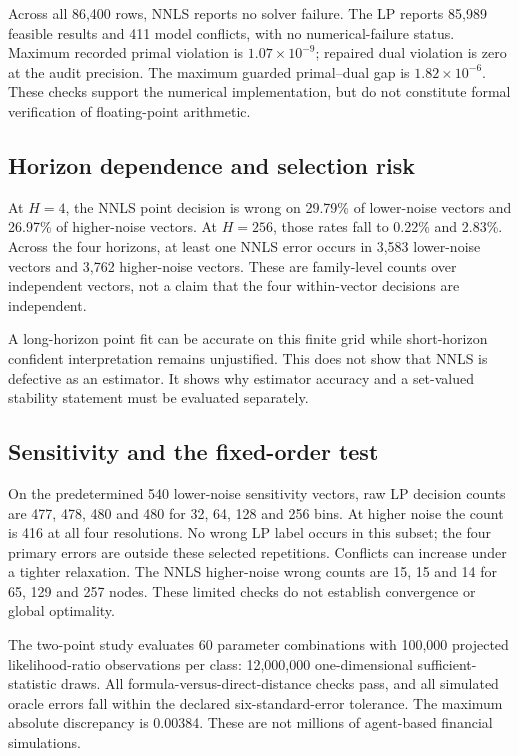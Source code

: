 \documentclass[11pt]{article}
\theoremstyle{remark}\newtheorem{remark}[proposition]{Remark}
\begin{document}
Across all 86,400 rows, NNLS reports no solver failure. The LP reports 85,989 feasible results and 411 model conflicts, with no numerical-failure status. Maximum recorded primal violation is $1.07\times10^{-9}$; repaired dual violation is zero at the audit precision. The maximum guarded primal--dual gap is $1.82\times10^{-6}$. These checks support the numerical implementation, but do not constitute formal verification of floating-point arithmetic.

\subsection{Horizon dependence and selection risk}
At $H=4$, the NNLS point decision is wrong on 29.79\% of lower-noise vectors and 26.97\% of higher-noise vectors. At $H=256$, those rates fall to 0.22\% and 2.83\%. Across the four horizons, at least one NNLS error occurs in 3,583 lower-noise vectors and 3,762 higher-noise vectors. These are family-level counts over independent vectors, not a claim that the four within-vector decisions are independent.

A long-horizon point fit can be accurate on this finite grid while short-horizon confident interpretation remains unjustified. This does not show that NNLS is defective as an estimator. It shows why estimator accuracy and a set-valued stability statement must be evaluated separately.

\subsection{Sensitivity and the fixed-order test}
On the predetermined 540 lower-noise sensitivity vectors, raw LP decision counts are 477, 478, 480 and 480 for 32, 64, 128 and 256 bins. At higher noise the count is 416 at all four resolutions. No wrong LP label occurs in this subset; the four primary errors are outside these selected repetitions. Conflicts can increase under a tighter relaxation. The NNLS higher-noise wrong counts are 15, 15 and 14 for 65, 129 and 257 nodes. These limited checks do not establish convergence or global optimality.

The two-point study evaluates 60 parameter combinations with 100,000 projected likelihood-ratio observations per class: 12,000,000 one-dimensional sufficient-statistic draws. All formula-versus-direct-distance checks pass, and all simulated oracle errors fall within the declared six-standard-error tolerance. The maximum absolute discrepancy is 0.00384. These are not millions of agent-based financial simulations.
\end{document}
